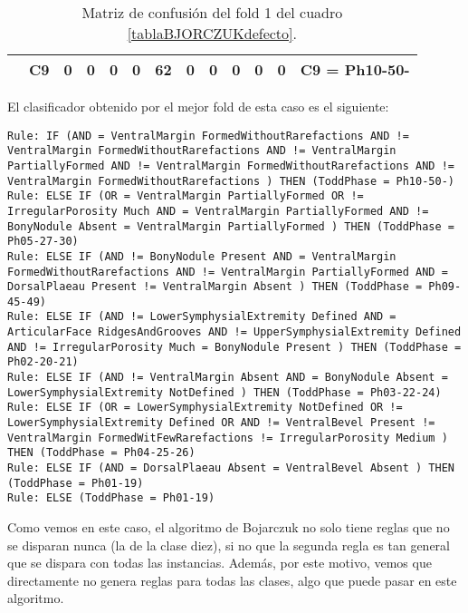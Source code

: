 \begin{table}[H]
{\begin{tabular}{|ccccccccccccc|}
\multicolumn{1}{|c|}{}                                      & \multicolumn{1}{c|}{C9} & \multicolumn{1}{c|}{0}  & \multicolumn{1}{c|}{0}  & \multicolumn{1}{c|}{0}  & \multicolumn{1}{c|}{0}  & \multicolumn{1}{c|}{\textbf{62}}  & \multicolumn{1}{c|}{0}  & \multicolumn{1}{c|}{0}  & \multicolumn{1}{c|}{0}  & \multicolumn{1}{c|}{0}  & \multicolumn{1}{c|}{0} & C9 = Ph10-50-     \\ \hline
\end{tabular}%
}
\caption{Matriz de confusión del fold 1 del cuadro \ref{tablaBJORCZUKdefecto}.}
\end{table}



El clasificador obtenido por el mejor fold de esta caso es el siguiente:

\begin{lstlisting}
Rule: IF (AND = VentralMargin FormedWithoutRarefactions AND != VentralMargin FormedWithoutRarefactions AND != VentralMargin PartiallyFormed AND != VentralMargin FormedWithoutRarefactions AND != VentralMargin FormedWithoutRarefactions ) THEN (ToddPhase = Ph10-50-)
Rule: ELSE IF (OR = VentralMargin PartiallyFormed OR != IrregularPorosity Much AND = VentralMargin PartiallyFormed AND != BonyNodule Absent = VentralMargin PartiallyFormed ) THEN (ToddPhase = Ph05-27-30)
Rule: ELSE IF (AND != BonyNodule Present AND = VentralMargin FormedWithoutRarefactions AND != VentralMargin PartiallyFormed AND = DorsalPlaeau Present != VentralMargin Absent ) THEN (ToddPhase = Ph09-45-49)
Rule: ELSE IF (AND != LowerSymphysialExtremity Defined AND = ArticularFace RidgesAndGrooves AND != UpperSymphysialExtremity Defined AND != IrregularPorosity Much = BonyNodule Present ) THEN (ToddPhase = Ph02-20-21)
Rule: ELSE IF (AND != VentralMargin Absent AND = BonyNodule Absent = LowerSymphysialExtremity NotDefined ) THEN (ToddPhase = Ph03-22-24)
Rule: ELSE IF (OR = LowerSymphysialExtremity NotDefined OR != LowerSymphysialExtremity Defined OR AND != VentralBevel Present != VentralMargin FormedWitFewRarefactions != IrregularPorosity Medium ) THEN (ToddPhase = Ph04-25-26)
Rule: ELSE IF (AND = DorsalPlaeau Absent = VentralBevel Absent ) THEN (ToddPhase = Ph01-19)
Rule: ELSE (ToddPhase = Ph01-19)
\end{lstlisting}

Como vemos en este caso, el algoritmo de Bojarczuk no solo tiene reglas que no se disparan nunca (la de la clase diez), si no que la segunda regla es tan general que se dispara con todas las instancias. Además, por este motivo, vemos que directamente no genera reglas para todas las clases, algo que puede pasar en este algoritmo.

